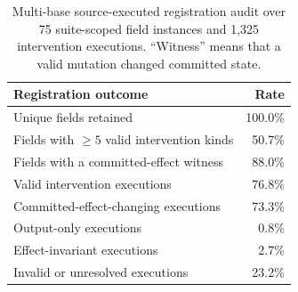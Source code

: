 \begin{table}[t]
\centering
\small
\setlength{\tabcolsep}{4pt}
\caption{Multi-base source-executed registration audit over 75 suite-scoped
field instances and 1,325 intervention executions. ``Witness'' means that a
valid mutation changed committed state.}
\label{tab:registration-sufficiency}
\begin{tabular}{lr}
\toprule
Registration outcome & Rate \\
\midrule
Unique fields retained & 100.0\% \\
Fields with $\geq 5$ valid intervention kinds & 50.7\% \\
Fields with a committed-effect witness & 88.0\% \\
Valid intervention executions & 76.8\% \\
Committed-effect-changing executions & 73.3\% \\
Output-only executions & 0.8\% \\
Effect-invariant executions & 2.7\% \\
Invalid or unresolved executions & 23.2\% \\
\bottomrule
\end{tabular}
\end{table}
